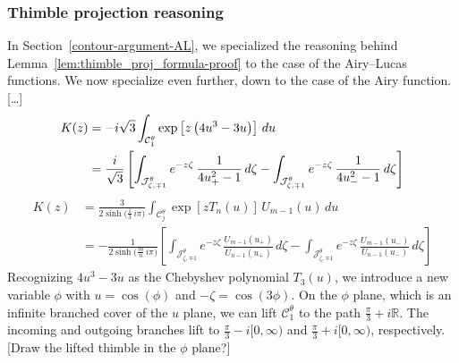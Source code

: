 \documentclass{article}
\newcommand{\R}{\mathbb{R}}
\theoremstyle{definition}
\theoremstyle{plain}
\newenvironment{verify}{\color{ForestGreen}}{\color{black}}
\newenvironment{todo}{\color{Coral}}{\color{black}}
\newenvironment{revised}{\color{DarkBlue}}{\color{black}}
\begin{document}
\subsubsection{Thimble projection reasoning}\label{contour-argument-airy}
\begin{revised}
In Section~\ref{contour-argument-AL}, we specialized the reasoning behind Lemma~\ref{lem:thimble_proj_formula-proof} to the case of the Airy--Lucas functions. We now specialize even further, down to the case of the Airy function. \begin{todo}[\ldots]\end{todo}
\begin{align*}
K(z) & = \begin{todo}-\end{todo}i\sqrt{3} \int_{\mathcal{C}^\theta_1} \exp\left[z \left(4u^3 - 3u\right)\right]\,du \\
& = \frac{i}{\sqrt{3}} \left[ \int_{\mathcal{J}^\theta_{\zeta, \mp 1}} e^{-z\zeta}\,\frac{1}{4u_+^2 - 1}\,d\zeta - \int_{\mathcal{J}^\theta_{\zeta, \mp 1}} e^{-z\zeta}\,\frac{1}{4u_-^2 - 1}\,d\zeta \right]
\end{align*}
\begin{verify}
\begin{align*}%
K(z) & = \frac{3}{2 \sinh\big(\tfrac{1}{3}\,i\pi\big)} \int_{\mathcal{C}^\theta_j} \exp\left[z T_n(u)\right]\,U_{m-1}(u)\,du \\
& = -\frac{1}{2\sinh\big(\tfrac{m}{n}\,i\pi\big)} \left[ \int_{\mathcal{J}^\theta_{\zeta, \mp 1}} e^{-z\zeta}\,\frac{U_{m-1}(u_+)}{U_{n-1}(u_+)}\,d\zeta - \int_{\mathcal{J}^\theta_{\zeta, \mp 1}} e^{-z\zeta}\,\frac{U_{m-1}(u_-)}{U_{n-1}(u_-)}\,d\zeta \right]
\end{align*}
\end{verify}
Recognizing $4u^3 - 3u$ as the Chebyshev polynomial $T_3(u)$, we introduce a new variable $\phi$ with $u = \cos(\phi)$ and $-\zeta = \cos(3\phi)$. On the $\phi$ plane, which is an infinite branched cover of the $u$ plane, we can lift $\mathcal{C}^\theta_1$ to the path $\tfrac{\pi}{3} + i\R$. The incoming and outgoing branches lift to $\tfrac{\pi}{3} - i[0, \infty)$ and $\tfrac{\pi}{3} + i[0, \infty)$, respectively. \begin{todo}[Draw the lifted thimble in the $\phi$ plane?]\end{todo}


\end{revised}
\end{document}
